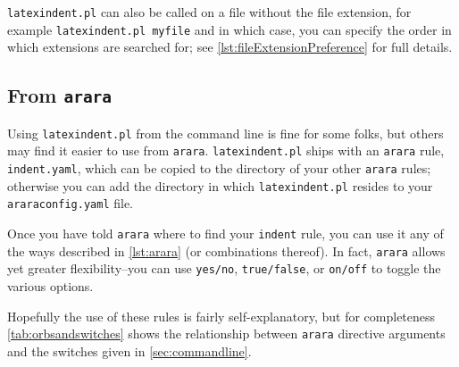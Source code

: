 \documentclass[11pt]{article}
\begin{document}
\lstinline!latexindent.pl! can also be called on a file without the file extension, for
example \lstinline[breaklines=true,breakatwhitespace=true,]!latexindent.pl myfile! and in which case, you can specify
the order in which extensions are searched for; see \vref{lst:fileExtensionPreference}
for full details.

\subsection{From \lstinline!arara!}\label{sec:arara}
Using \lstinline!latexindent.pl! from the command line is fine for some folks, but
others may find it easier to use from \lstinline!arara!. \lstinline!latexindent.pl!
ships with an \lstinline!arara! rule, \lstinline!indent.yaml!, which can be copied
to the directory of
your other \lstinline!arara! rules; otherwise  you can add the directory in which \lstinline!latexindent.pl!
resides to your \lstinline!araraconfig.yaml! file.

Once you have told \lstinline!arara! where to find your \lstinline!indent! rule,
you can use it any of the ways described in \cref{lst:arara} (or combinations thereof).
In fact, \lstinline!arara! allows yet greater flexibility--you can use \lstinline!yes/no!, \lstinline!true/false!, or \lstinline!on/off! to toggle the various options.


Hopefully the use of these rules is fairly self-explanatory, but for completeness
\cref{tab:orbsandswitches} shows the relationship between \lstinline!arara! directive arguments and the
switches given in \cref{sec:commandline}.
\end{document}
